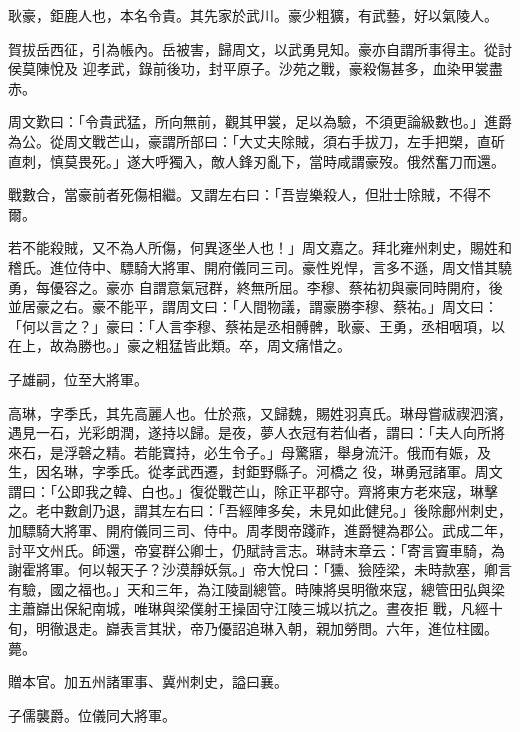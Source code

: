 \begin{pinyinscope}
 耿豪，鉅鹿人也，本名令貴。其先家於武川。豪少粗獷，有武藝，好以氣陵人。



 賀拔岳西征，引為帳內。岳被害，歸周文，以武勇見知。豪亦自謂所事得主。從討侯莫陳悅及
 迎孝武，錄前後功，封平原子。沙苑之戰，豪殺傷甚多，血染甲裳盡赤。



 周文歎曰：「令貴武猛，所向無前，觀其甲裳，足以為驗，不須更論級數也。」進爵為公。從周文戰芒山，豪謂所部曰：「大丈夫除賊，須右手拔刀，左手把槊，直斫直刺，慎莫畏死。」遂大呼獨入，敵人鋒刃亂下，當時咸謂豪歿。俄然奮刀而還。



 戰數合，當豪前者死傷相繼。又謂左右曰：「吾豈樂殺人，但壯士除賊，不得不爾。



 若不能殺賊，又不為人所傷，何異逐坐人也！」周文嘉之。拜北雍州刺史，賜姓和稽氏。進位侍中、驃騎大將軍、開府儀同三司。豪性兇悍，言多不遜，周文惜其驍勇，每優容之。豪亦
 自謂意氣冠群，終無所屈。李穆、蔡祐初與豪同時開府，後並居豪之右。豪不能平，謂周文曰：「人間物議，謂豪勝李穆、蔡祐。」周文曰：「何以言之？」豪曰：「人言李穆、蔡祐是丞相髆髀，耿豪、王勇，丞相咽項，以在上，故為勝也。」豪之粗猛皆此類。卒，周文痛惜之。



 子雄嗣，位至大將軍。



 高琳，字季氏，其先高麗人也。仕於燕，又歸魏，賜姓羽真氏。琳母嘗祓禊泗濱，遇見一石，光彩朗潤，遂持以歸。是夜，夢人衣冠有若仙者，謂曰：「夫人向所將來石，是浮磬之精。若能寶持，必生令子。」母驚寤，舉身流汗。俄而有娠，及生，因名琳，字季氏。從孝武西遷，封鉅野縣子。河橋之
 役，琳勇冠諸軍。周文謂曰：「公即我之韓、白也。」復從戰芒山，除正平郡守。齊將東方老來寇，琳擊之。老中數創乃退，謂其左右曰：「吾經陣多矣，未見如此健兒。」後除鄜州刺史，加驃騎大將軍、開府儀同三司、侍中。周孝閔帝踐祚，進爵犍為郡公。武成二年，討平文州氏。師還，帝宴群公卿士，仍賦詩言志。琳詩末章云：「寄言竇車騎，為謝霍將軍。何以報天子？沙漠靜妖氛。」帝大悅曰：「獯、獫陸梁，未時款塞，卿言有驗，國之福也。」天和三年，為江陵副總管。時陳將吳明徹來寇，總管田弘與梁主蕭巋出保紀南城，唯琳與梁僕射王操固守江陵三城以抗之。晝夜拒
 戰，凡經十旬，明徹退走。巋表言其狀，帝乃優詔追琳入朝，親加勞問。六年，進位柱國。薨。



 贈本官。加五州諸軍事、冀州刺史，謚曰襄。



 子儒襲爵。位儀同大將軍。




\end{pinyinscope}
